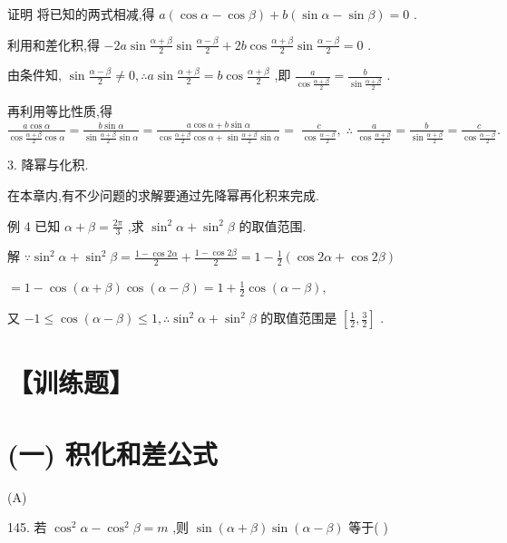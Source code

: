\documentclass[10pt]{article}
\begin{document}
证明 将已知的两式相减,得 \(a\left( {\cos \alpha  - \cos \beta }\right)  + b\left( {\sin \alpha  - \sin \beta }\right)  = 0\) .

利用和差化积,得 \(- {2a}\sin \frac{\alpha  + \beta }{2}\sin \frac{\alpha  - \beta }{2} + {2b}\cos \frac{\alpha  + \beta }{2}\sin \frac{\alpha  - \beta }{2} = 0\) .

由条件知, \(\sin \frac{\alpha  - \beta }{2} \neq  0,\therefore a\sin \frac{\alpha  + \beta }{2} = b\cos \frac{\alpha  + \beta }{2}\) ,即 \(\frac{a}{\cos \frac{\alpha  + \beta }{2}} = \frac{b}{\sin \frac{\alpha  + \beta }{2}}\) .

再利用等比性质,得 \(\frac{a\cos \alpha }{\cos \frac{\alpha  + \beta }{2}\cos \alpha } = \frac{b\sin \alpha }{\sin \frac{\alpha  + \beta }{2}\sin \alpha } = \frac{a\cos \alpha  + b\sin \alpha }{\cos \frac{\alpha  + \beta }{2}\cos \alpha  + \sin \frac{\alpha  + \beta }{2}\sin \alpha } = \; \frac{c}{\cos \frac{\alpha  - \beta }{2}},\;\therefore \;\frac{a}{\cos \frac{\alpha  + \beta }{2}} = \frac{b}{\sin \frac{\alpha  + \beta }{2}} = \frac{c}{\cos \frac{\alpha  - \beta }{2}}.\)

3. 降幂与化积.

在本章内,有不少问题的求解要通过先降幂再化积来完成.

例 4 已知 \(\alpha  + \beta  = \frac{2\pi }{3}\) ,求 \({\sin }^{2}\alpha  + {\sin }^{2}\beta\) 的取值范围.

解 \(\because {\sin }^{2}\alpha  + {\sin }^{2}\beta  = \frac{1 - \cos {2\alpha }}{2} + \frac{1 - \cos {2\beta }}{2} = 1 - \frac{1}{2}\left( {\cos {2\alpha } + \cos {2\beta }}\right)\)

\(= 1 - \cos \left( {\alpha  + \beta }\right) \cos \left( {\alpha  - \beta }\right)  = 1 + \frac{1}{2}\cos \left( {\alpha  - \beta }\right) ,\)

又 \(- 1 \leq  \cos \left( {\alpha  - \beta }\right)  \leq  1,\therefore {\sin }^{2}\alpha  + {\sin }^{2}\beta\) 的取值范围是 \(\left\lbrack  {\frac{1}{2},\frac{3}{2}}\right\rbrack\) .

\section*{【训练题】}

\section*{(一) 积化和差公式}

(A)

145. 若 \({\cos }^{2}\alpha  - {\cos }^{2}\beta  = m\) ,则 \(\sin \left( {\alpha  + \beta }\right) \sin \left( {\alpha  - \beta }\right)\) 等于(   )
\end{document}
